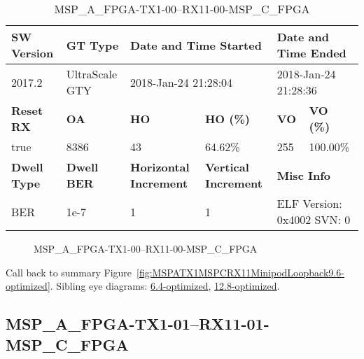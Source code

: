 \begin{table}[h]
\centering
\caption{MSP\_A\_FPGA-TX1-00--RX11-00-MSP\_C\_FPGA}
\label{tab:MSPAFPGATX100RX1100MSPCFPGA9.6-optimized}
\begin{tabular}{@{}|l|l|l|l|l|l|@{}}
\toprule
\textbf{SW Version}                & \textbf{GT Type}   & \multicolumn{2}{l|}{\textbf{Date and Time Started}}            & \multicolumn{2}{l|}{\textbf{Date and Time Ended}}        \\ \midrule
2017.2                       & UltraScale GTY          & \multicolumn{2}{l|}{2018-Jan-24 21:28:04}                   & \multicolumn{2}{l|}{2018-Jan-24 21:28:36}               \\ \midrule
\textbf{Reset RX}                  & \textbf{OA} & \textbf{HO}   & \textbf{HO (\%)} & \textbf{VO} & \textbf{VO (\%)} \\ \midrule
true & 8386        & 43          & 64.62\%        & 255        & 100.00\%       \\ \midrule
\textbf{Dwell Type}                & \textbf{Dwell BER} & \textbf{Horizontal Increment} & \textbf{Vertical Increment}    & \multicolumn{2}{l|}{\textbf{Misc Info}}                  \\ \midrule
BER                            & 1e-7        & 1        & 1           & \multicolumn{2}{l|}{ELF Version: 0x4002 SVN: 0}                         \\ \bottomrule
\end{tabular}
\end{table}

\begin{figure}[h]
\caption{MSP\_A\_FPGA-TX1-00--RX11-00-MSP\_C\_FPGA} \label{fig:MSPAFPGATX100RX1100MSPCFPGA9.6-optimized}
\end{figure}

Call back to summary Figure~\ref{fig:MSPATX1MSPCRX11MinipodLoopback9.6-optimized}.
Sibling eye diagrams: \hyperref[sec:MSPAFPGATX100RX1100MSPCFPGA6.4-optimized]{6.4-optimized}, \hyperref[sec:MSPAFPGATX100RX1100MSPCFPGA12.8-optimized]{12.8-optimized}.

\clearpage
\newpage


\subsection{MSP\_A\_FPGA-TX1-01--RX11-01-MSP\_C\_FPGA}\label{sec:MSPAFPGATX101RX1101MSPCFPGA9.6-optimized}

